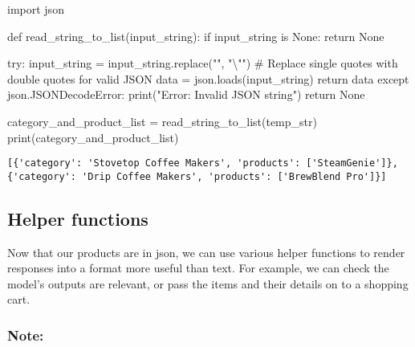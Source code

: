 \documentclass[
  letterpaper,
  DIV=11,
  numbers=noendperiod]{scrreprt}
\newenvironment{Shaded}{\begin{snugshade}}{\end{snugshade}}
\newcommand{\BuiltInTok}[1]{\textcolor[rgb]{0.00,0.23,0.31}{#1}}
\newcommand{\CharTok}[1]{\textcolor[rgb]{0.13,0.47,0.30}{#1}}
\newcommand{\CommentTok}[1]{\textcolor[rgb]{0.37,0.37,0.37}{#1}}
\newcommand{\ControlFlowTok}[1]{\textcolor[rgb]{0.00,0.23,0.31}{#1}}
\newcommand{\ImportTok}[1]{\textcolor[rgb]{0.00,0.46,0.62}{#1}}
\newcommand{\KeywordTok}[1]{\textcolor[rgb]{0.00,0.23,0.31}{#1}}
\newcommand{\NormalTok}[1]{\textcolor[rgb]{0.00,0.23,0.31}{#1}}
\newcommand{\OperatorTok}[1]{\textcolor[rgb]{0.37,0.37,0.37}{#1}}
\newcommand{\StringTok}[1]{\textcolor[rgb]{0.13,0.47,0.30}{#1}}
\newcommand{\VariableTok}[1]{\textcolor[rgb]{0.07,0.07,0.07}{#1}}
\begin{document}
\begin{Shaded}
\begin{Highlighting}[]
\ImportTok{import}\NormalTok{ json}

\KeywordTok{def}\NormalTok{ read\_string\_to\_list(input\_string):}
    \ControlFlowTok{if}\NormalTok{ input\_string }\KeywordTok{is} \VariableTok{None}\NormalTok{:}
        \ControlFlowTok{return} \VariableTok{None}

    \ControlFlowTok{try}\NormalTok{:}
\NormalTok{        input\_string }\OperatorTok{=}\NormalTok{ input\_string.replace(}\StringTok{"\textquotesingle{}"}\NormalTok{, }\StringTok{"}\CharTok{\textbackslash{}"}\StringTok{"}\NormalTok{)  }\CommentTok{\# Replace single quotes with double quotes for valid JSON}
\NormalTok{        data }\OperatorTok{=}\NormalTok{ json.loads(input\_string)}
        \ControlFlowTok{return}\NormalTok{ data}
    \ControlFlowTok{except}\NormalTok{ json.JSONDecodeError:}
        \BuiltInTok{print}\NormalTok{(}\StringTok{"Error: Invalid JSON string"}\NormalTok{)}
        \ControlFlowTok{return} \VariableTok{None}
\end{Highlighting}
\end{Shaded}

\begin{Shaded}
\begin{Highlighting}[]
\NormalTok{category\_and\_product\_list }\OperatorTok{=}\NormalTok{ read\_string\_to\_list(temp\_str)}
\BuiltInTok{print}\NormalTok{(category\_and\_product\_list)}
\end{Highlighting}
\end{Shaded}

\begin{verbatim}
[{'category': 'Stovetop Coffee Makers', 'products': ['SteamGenie']}, {'category': 'Drip Coffee Makers', 'products': ['BrewBlend Pro']}]
\end{verbatim}

\hypertarget{helper-functions}{%
\subsection{Helper functions}\label{helper-functions}}

Now that our products are in json, we can use various helper functions
to render responses into a format more useful than text. For example, we
can check the model's outputs are relevant, or pass the items and their
details on to a shopping cart.

\hypertarget{note}{%
\subsubsection{Note:}\label{note}}
\end{document}
